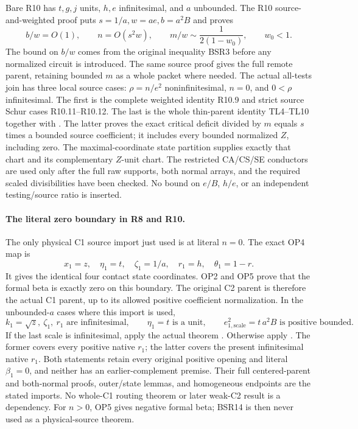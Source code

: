 Bare R10 has \(t,g,j\) units, \(h,e\) infinitesimal,
and \(a\) unbounded.  The R10 source-and-weighted proof puts
\(s=1/a,w=ae,b=a^2B\) and proves
\[
 b/w=O(1),\qquad n=O(s^2w),\qquad
 m/w\sim\frac1{2(1-w_0)},\qquad w_0<1 .
 \tag{BSR13}
\]
The bound on \(b/w\) comes from the original inequality
BSR3 before any normalized circuit is introduced.
The same source proof gives the full remote parent,
retaining bounded \(m\) as a whole packet where needed.
The actual all-tests join has three local source cases:
\(\rho=n/e^2\) noninfinitesimal, \(n=0\), and
\(0<\rho\) infinitesimal.
The first is the complete weighted identity R10.9
and strict source Schur cases R10.11--R10.12.
The last is the whole thin-parent identity TL4--TL10
together with .
The latter proves the exact critical deficit divided
by \(m\) equals \(s\) times a bounded source coefficient;
it includes every bounded normalized \(Z\), including zero.
The maximal-coordinate state partition supplies exactly
that chart and its complementary \(Z\)-unit chart.
The restricted CA/CS/SE conductors are used only after
the full raw supports, both normal arrays, and the
required scaled divisibilities have been checked.
No bound on \(e/B\), \(h/e\), or an independent
testing/source ratio is inserted.

\paragraph{The literal zero boundary in R8 and R10.}
The only physical C1 source import just used is
at literal \(n=0\).
The exact OP4 map is
\[
 x_1=z,\quad \eta_1=t,\quad \zeta_1=1/a,\quad
 r_1=h,\quad \theta_1=1-r .
 \tag{BSR14}
\]
It gives the identical four contact state coordinates.
OP2 and OP5 prove that the formal beta is exactly zero
on this boundary.  The original C2 parent is therefore
the actual C1 parent, up to its allowed positive
coefficient normalization.
In the unbounded-\(a\) cases where this import is used,
\[
 k_1=\sqrt z,\ \zeta_1,\ r_1\text{ are infinitesimal},
 \qquad \eta_1=t\text{ is a unit},\qquad
 e_{1,\mathrm{scale}}^2=t\,a^2B
 \text{ is positive bounded}.
 \tag{BSR15}
\]
If the last scale is infinitesimal, apply the actual
theorem .
Otherwise apply .
The former covers every positive native \(r_1\);
the latter covers the present infinitesimal native \(r_1\).
Both statements retain every original positive opening
and literal \(\beta_1=0\), and neither has an
earlier-complement premise.
Their full centered-parent and both-normal proofs,
outer/state lemmas, and homogeneous endpoints are
the stated imports.  No whole-C1 routing theorem
or later weak-C2 result is a dependency.
For \(n>0\), OP5 gives negative formal beta;
BSR14 is then never used as a physical-source theorem.

